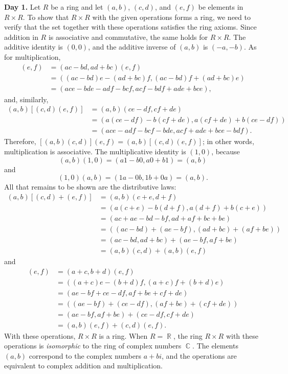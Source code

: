 \documentclass{article}
\DeclareMathOperator{\R}{\mathbb{R}}
\DeclareMathOperator{\C}{\mathbb{C}}
\begin{document}
\textbf{Day 1.} Let \(R\) be a ring and let \((a,b)\), \((c,d)\), and \((e,f)\) be elements in \(R\times R\). To show that \(R\times R\) with the given operations forms a ring, we need to verify that the set together with these operations satisfies the ring axioms. Since addition in \(R\) is associative and commutative, the same holds for \(R\times R\). The additive identity is \((0,0)\), and the additive inverse of \((a,b)\) is \((-a,-b)\). As for multiplication,
\begin{align*}
    [(a,b)(c,d)](e,f) &= (ac-bd, ad+bc)(e,f) \\
    &= ((ac-bd)e-(ad+bc)f, (ac-bd)f+(ad+bc)e) \\
    &= (ace-bde-adf-bcf, acf-bdf+ade+bce),
\end{align*}
and, similarly,
\begin{align*}
    (a,b)[(c,d)(e,f)] &= (a,b)(ce-df,cf+de) \\
    &= (a(ce-df)-b(cf+de), a(cf+de)+b(ce-df)) \\
    &= (ace-adf-bcf-bde, acf+ade+bce-bdf).
\end{align*}
Therefore, \([(a,b)(c,d)](e,f)=(a,b)[(c,d)(e,f)]\); in other words, multiplication is associative. The multiplicative identity is \((1,0)\), because
\[(a,b)(1,0)=(a1-b0, a0+b1)=(a,b)\]
and
\[(1,0)(a,b)=(1a-0b, 1b+0a)=(a,b).\]
All that remains to be shown are the distributive laws:
\begin{align*}
    (a,b)[(c,d)+(e,f)] &= (a,b)(c+e,d+f) \\
    &= (a(c+e)-b(d+f),a(d+f)+b(c+e)) \\
    &= (ac+ae-bd-bf, ad+af+bc+be) \\
    &= ((ac-bd)+(ae-bf), (ad+bc)+(af+be)) \\
    &= (ac-bd,ad+bc)+(ae-bf,af+be) \\
    &= (a,b)(c,d)+(a,b)(e,f)
\end{align*}
and
\begin{align*}
    [(a,b)+(c,d)](e,f) &= (a+c,b+d)(e,f) \\
    &= ((a+c)e-(b+d)f, (a+c)f+(b+d)e) \\
    &= (ae-bf+ce-df, af+be+cf+de) \\
    &= ((ae-bf)+(ce-df), (af+be)+(cf+de)) \\
    &= (ae-bf, af+be) + (ce-df, cf+de) \\
    &= (a,b)(e,f) + (c,d)(e,f).
\end{align*}
With these operations, \(R\times R\) is a ring. When \(R=\R\), the ring \(R\times R\) with these operations is \textit{isomorphic} to the ring of complex numbers \(\C\). The 
elements \((a,b)\) correspond to the complex numbers \(a+bi\), and the operations are equivalent to complex addition and multiplication. 
\end{document}
